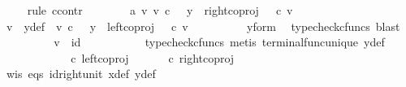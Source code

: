 \begin{isabellebody}
\ \ \ \ \isamarkupfalse%
{\isacharparenleft}{\kern0pt}rule\ ccontr{\isacharparenright}{\kern0pt}\isanewline
\ \ \ \ \ \ \isamarkupfalse%
\ a{}{\isacharcolon}{\kern0pt}\ {\isachardoublequoteopen}{\isasymnexists}v{\isachardot}{\kern0pt}\ v\ {\isasymin}\isactrlsub c\ {\isasymone}\ {\isasymand}\ y\ {\isacharequal}{\kern0pt}\ right{\isacharunderscore}{\kern0pt}coproj\ {\isasymone}\ {\isasymone}\ {\isasymcirc}\isactrlsub c\ v{\isachardoublequoteclose}\isanewline
\ \ \ \ \ \ \isamarkupfalse%
\ \isamarkupfalse%
\ v\ \ y{\isacharunderscore}{\kern0pt}def{\isacharcolon}{\kern0pt}\ \ {\isachardoublequoteopen}v\ {\isasymin}\isactrlsub c\ {\isasymone}\ {\isasymand}\ y\ {\isacharequal}{\kern0pt}\ left{\isacharunderscore}{\kern0pt}coproj\ {\isasymone}\ {\isasymone}\ {\isasymcirc}\isactrlsub c\ v{\isachardoublequoteclose}\isanewline
\ \ \ \ \ \ \ \ \isamarkupfalse%
\ y{\isacharunderscore}{\kern0pt}form\ \isamarkupfalse%
\ {\isacharparenleft}{\kern0pt}typecheck{\isacharunderscore}{\kern0pt}cfuncs{\isacharcomma}{\kern0pt}\ blast{\isacharparenright}{\kern0pt}\isanewline
\ \ \ \ \ \ \isamarkupfalse%
\ \isamarkupfalse%
\ {\isachardoublequoteopen}v\ {\isacharequal}{\kern0pt}\ id\ {\isasymone}{\isachardoublequoteclose}\isanewline
\ \ \ \ \ \ \ \ \isamarkupfalse%
\ {\isacharparenleft}{\kern0pt}typecheck{\isacharunderscore}{\kern0pt}cfuncs{\isacharcomma}{\kern0pt}\ metis\ terminal{\isacharunderscore}{\kern0pt}func{\isacharunderscore}{\kern0pt}unique\ y{\isacharunderscore}{\kern0pt}def{\isacharparenright}{\kern0pt}\isanewline
\ \ \ \ \ \ \isamarkupfalse%
\ \isamarkupfalse%
\ {\isachardoublequoteopen}{\isasymlangle}{\isasymt}{\isacharcomma}{\kern0pt}{\isasymf}{\isasymrangle}\ {\isasymamalg}\ {\isasymlangle}{\isasymf}{\isacharcomma}{\kern0pt}{\isasymt}{\isasymrangle}\ {\isasymcirc}\isactrlsub c\ left{\isacharunderscore}{\kern0pt}coproj\ {\isasymone}\ {\isasymone}\ {\isacharequal}{\kern0pt}\ {\isasymlangle}{\isasymt}{\isacharcomma}{\kern0pt}{\isasymf}{\isasymrangle}\ {\isasymamalg}\ {\isasymlangle}{\isasymf}{\isacharcomma}{\kern0pt}{\isasymt}{\isasymrangle}\ {\isasymcirc}\isactrlsub c\ right{\isacharunderscore}{\kern0pt}coproj\ {\isasymone}\ {\isasymone}{\isachardoublequoteclose}\isanewline
\ \ \ \ \ \ \ \ \isamarkupfalse%
\ w{\isacharunderscore}{\kern0pt}is\ eqs\ id{\isacharunderscore}{\kern0pt}right{\isacharunderscore}{\kern0pt}unit{}\ x{\isacharunderscore}{\kern0pt}def\ y{\isacharunderscore}{\kern0pt}def\ \isamarkupfalse%

\end{isabellebody}
